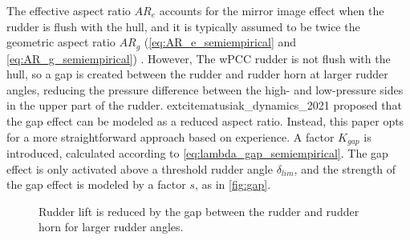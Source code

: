 The effective aspect ratio $AR_e$ accounts for the mirror image effect when the rudder is flush with the hull, and it is typically assumed to be twice the geometric aspect ratio $AR_g$ (\autoref{eq:AR_e_semiempirical} and \autoref{eq:AR_g_semiempirical}) \cite{hughes_tempest_2011}.
However, The wPCC rudder is not flush with the hull, so a gap is created between the rudder and rudder horn at larger rudder angles, reducing the pressure difference between the high- and low-pressure sides in the upper part of the rudder. 	extcite{matusiak_dynamics_2021} proposed that the gap effect can be modeled as a reduced aspect ratio. Instead, this paper opts for a more straightforward approach based on experience. A factor $K_{gap}$ is introduced, calculated according to \autoref{eq:lambda_gap_semiempirical}. The gap effect is only activated above a threshold rudder angle $\delta_{lim}$, and the strength of the gap effect is modeled by a factor $s$, as in \autoref{fig:gap}.
%
\begin{equation}
    \label{eq:AR_g_semiempirical}
    
\end{equation}
%
\begin{equation}
    \label{eq:AR_e_semiempirical}
    
\end{equation}
%
\begin{equation}
    \label{eq:lambda_gap_semiempirical}
    
\end{equation}
\begin{figure}[h]
    \centering
    
    \caption{Rudder lift is reduced by the gap between the rudder and rudder horn for larger rudder angles.}
    \label{fig:gap}
\end{figure}

